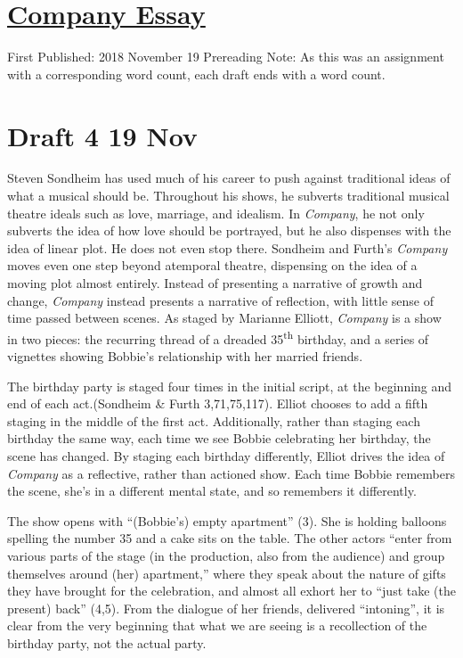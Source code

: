 \documentclass[12pt]{article}[titlepage]
\newcommand{\say}[1]{``#1''}
\newcommand{\1}{\={a}}
\newcommand{\2}{\={e}}
\newcommand{\3}{\={\i}}
\newcommand{\4}{\=o}
\newcommand{\5}{\=u}
\newcommand{\6}{\={A}}
\renewcommand{\,}{\textsuperscript{,}}
\begin{document}
\doublespacing
\section{\href{company-essay.html}{Company Essay}}
First Published: 2018 November 19
Prereading Note: As this was an assignment with a corresponding word count, each draft ends with a word count.

\section{Draft 4 19 Nov}
Steven Sondheim has used much of his career to push against traditional ideas of what a musical should be.
Throughout his shows, he subverts traditional musical theatre ideals such as love, marriage, and idealism.
In \textit{Company}, he not only subverts the idea of how love should be portrayed, but he also dispenses with the idea of linear plot.
He does not even stop there.
Sondheim and Furth's \textit{Company} moves even one step beyond atemporal theatre, dispensing on the idea of a moving plot almost entirely.
Instead of presenting a narrative of growth and change, \textit{Company} instead presents a narrative of reflection, with little sense of time passed between scenes.
As staged by Marianne Elliott, \textit{Company} is a show in two pieces: the recurring thread of a dreaded 35\textsuperscript{th} birthday, and a series of vignettes showing Bobbie's relationship with her married friends.

The birthday party is staged four times in the initial script, at the beginning and end of each act.(Sondheim \& Furth 3,71,75,117).
Elliot chooses to add a fifth staging in the middle of the first act.
Additionally, rather than staging each birthday the same way, each time we see Bobbie celebrating her birthday, the scene has changed.
By staging each birthday differently, Elliot drives the idea of \textit{Company} as a reflective, rather than actioned show.
Each time Bobbie remembers the scene, she's in a different mental state, and so remembers it differently.

The show opens with \say{(Bobbie's) empty apartment} (3).
She is holding balloons spelling the number 35 and a cake sits on the table.
The other actors \say{enter from various parts of the stage (in the production, also from the audience) and group themselves around (her) apartment,} where they speak about the nature of gifts they have brought for the celebration, and almost all exhort her to \say{just take (the present) back} (4,5).
From the dialogue of her friends, delivered \say{intoning}, it is clear from the very beginning that what we are seeing is a recollection of the birthday party, not the actual party.
\end{document}
